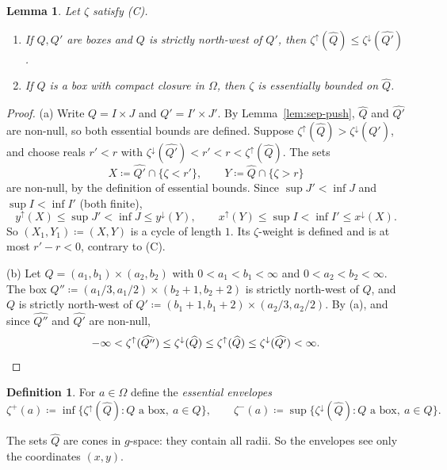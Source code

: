 \documentclass[11pt]{article}
\newtheorem{lemma}[theorem]{Lemma}
\theoremstyle{definition}\newtheorem{definition}[theorem]{Definition}
\theoremstyle{remark}\newtheorem{remark}[theorem]{Remark}
\begin{document}
\begin{lemma}\label{lem:sep-box}
Let $\zeta$ satisfy (C).
\begin{enumerate}[label=(\alph*)]
\item If $Q,Q'$ are boxes and $Q$ is strictly north-west of $Q'$, then
$\zeta^{\uparrow}(\widehat Q)\le\zeta^{\downarrow}(\widehat{Q'})$.
\item If $Q$ is a box with compact closure in $\Omega$, then $\zeta$ is
essentially bounded on $\widehat Q$.
\end{enumerate}
\end{lemma}

\begin{proof}
(a) Write $Q=I\times J$ and $Q'=I'\times J'$. By Lemma~\ref{lem:sep-push},
$\widehat Q$ and $\widehat{Q'}$ are non-null, so both essential bounds are
defined. Suppose
$\zeta^{\uparrow}(\widehat Q)>\zeta^{\downarrow}(\widehat{Q'})$, and choose
reals $r'<r$ with $\zeta^{\downarrow}(\widehat{Q'})<r'<r<\zeta^{\uparrow}(\widehat Q)$.
The sets
\[
 X\coloneqq\widehat{Q'}\cap\{\zeta<r'\},\qquad Y\coloneqq\widehat Q\cap\{\zeta>r\}
\]
are non-null, by the definition of essential bounds. Since $\sup J'<\inf J$
and $\sup I<\inf I'$ (both finite),
\[
 y^{\uparrow}(X)\le\sup J'<\inf J\le y^{\downarrow}(Y),\qquad
 x^{\uparrow}(Y)\le\sup I<\inf I'\le x^{\downarrow}(X).
\]
So $(X_1,Y_1)\coloneqq(X,Y)$ is a cycle of length $1$. Its $\zeta$-weight is
defined and is at most $r'-r<0$, contrary to (C).

(b) Let $Q=(a_1,b_1)\times(a_2,b_2)$ with $0<a_1<b_1<\infty$ and
$0<a_2<b_2<\infty$. The box $Q''\coloneqq(a_1/3,a_1/2)\times(b_2+1,b_2+2)$
is strictly north-west of $Q$, and $Q$ is strictly north-west of
$Q'\coloneqq(b_1+1,b_1+2)\times(a_2/3,a_2/2)$. By (a), and since
$\widehat{Q''}$ and $\widehat{Q'}$ are non-null,
\[
 -\infty<\zeta^{\uparrow}(\widehat{Q''})\le\zeta^{\downarrow}(\widehat Q)
 \le\zeta^{\uparrow}(\widehat Q)\le\zeta^{\downarrow}(\widehat{Q'})<\infty .
\qedhere
\]
\end{proof}

\begin{definition}\label{def:sep-env}
For $a\in\Omega$ define the \emph{essential envelopes}
\[
 \zeta^+(a)\coloneqq\inf\bigl\{\zeta^{\uparrow}(\widehat Q):Q\text{ a box},\ a\in Q\bigr\},
 \qquad
 \zeta^-(a)\coloneqq\sup\bigl\{\zeta^{\downarrow}(\widehat Q):Q\text{ a box},\ a\in Q\bigr\}.
\]
\end{definition}

The sets $\widehat Q$ are cones in $g$-space: they contain all radii. So the
envelopes see only the coordinates $(x,y)$.
\end{document}
